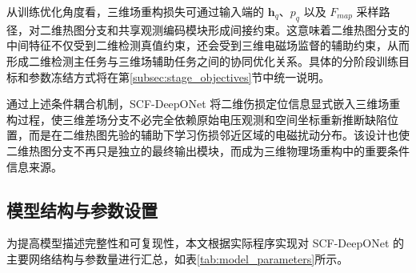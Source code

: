 从训练优化角度看，三维场重构损失可通过输入端的 $\mathbf h_q$、$p_q$ 以及 $F_{map}$ 采样路径，对二维热图分支和共享观测编码模块形成间接约束。这意味着二维热图分支的中间特征不仅受到二维检测真值约束，还会受到三维电磁场监督的辅助约束，从而形成二维检测主任务与三维场辅助任务之间的协同优化关系。具体的分阶段训练目标和参数冻结方式将在第\ref{subsec:stage_objectives}节中统一说明。

通过上述条件耦合机制，SCF-DeepONet 将二维伤损定位信息显式嵌入三维场重构过程，使三维差场分支不必完全依赖原始电压观测和空间坐标重新推断缺陷位置，而是在二维热图先验的辅助下学习伤损邻近区域的电磁扰动分布。该设计也使二维热图分支不再只是独立的最终输出模块，而成为三维物理场重构中的重要条件信息来源。

\subsection{模型结构与参数设置}
\label{subsec:model_parameters}

为提高模型描述完整性和可复现性，本文根据实际程序实现对 SCF-DeepONet 的主要网络结构与参数量进行汇总，如表\ref{tab:model_parameters}所示。

